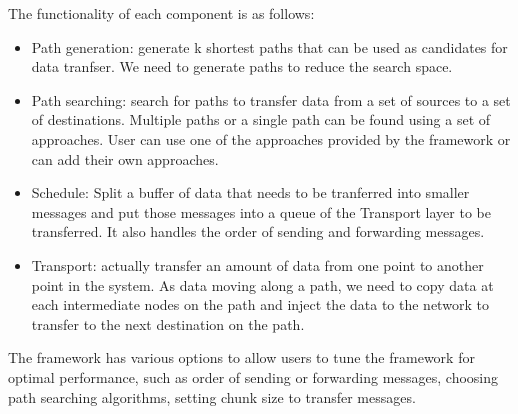 The functionality of each component is as follows:
\begin{itemize}
\item Path generation: generate k shortest paths that can be used as candidates for data tranfser. We need to generate paths to reduce the search space.
\item Path searching: search for paths to transfer data from a set of sources to a set of destinations. Multiple paths or a single path can be found using a set of approaches. User can use one of the approaches provided by the framework or can add their own approaches.

\item Schedule: Split a buffer of data that needs to be tranferred into smaller messages and put those messages into a queue of the Transport layer to be transferred. It also handles the order of sending and forwarding messages.

\item Transport: actually transfer an amount of data from one point to another point in the system. As data moving along a path, we need to copy data at each intermediate nodes on the path and inject the data to the network to transfer to the next destination on the path.

\end{itemize}

The framework has various options to allow users to tune the framework for optimal performance, such as order of sending or forwarding messages, choosing path searching algorithms, setting chunk size to transfer messages. 
